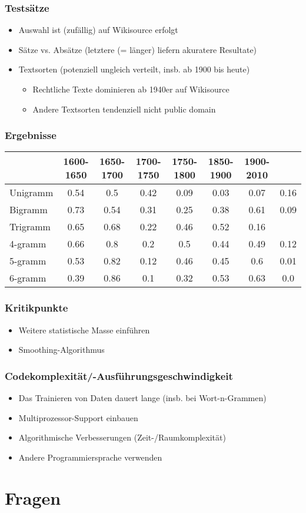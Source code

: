 \documentclass[t]{beamer} %
\begin{document}
\begin{frame}
  \frametitle{Testsätze}
  \begin{itemize}
  \item Auswahl ist (zufällig) auf Wikisource erfolgt\pause
  \vspace*{1ex}
  \item Sätze vs. Absätze (letztere (= länger) liefern akuratere Resultate)\pause
  \item Textsorten (potenziell ungleich verteilt, insb. ab 1900 bis heute)\pause
  \begin{itemize}
   \item Rechtliche Texte dominieren ab 1940er auf Wikisource
   \item Andere Textsorten tendenziell nicht public domain
  \end{itemize}
  \end{itemize}  
\end{frame}

\begin{frame}
  \frametitle{Ergebnisse}
  \begin{tabular}{l|ccccccc}
    & 1600-1650 & 1650-1700 & 1700-1750 & 1750-1800 & 1850-1900 &
    1900-2010 \\
    \hline
    Unigramm & 0.54 & 0.5 & 0.42 & 0.09 & 0.03 & 0.07 & 0.16 \\
    Bigramm & 0.73 & 0.54 & 0.31 & 0.25 & 0.38 & 0.61 & 0.09 \\
    Trigramm & 0.65 & 0.68 & 0.22 & 0.46 & 0.52 & 0.16 \\
    4-gramm & 0.66 & 0.8 & 0.2 & 0.5 & 0.44 & 0.49 & 0.12 \\
    5-gramm & 0.53 & 0.82 & 0.12 & 0.46 & 0.45 & 0.6 & 0.01 \\
    6-gramm & 0.39 & 0.86 & 0.1 & 0.32 & 0.53 & 0.63 & 0.0 \\
  \end{tabular}
\end{frame}

\begin{frame}
  \frametitle{Kritikpunkte}
  \begin{itemize}
  \item Weitere statistische Masse einführen\pause
  \item Smoothing-Algorithmus\pause
  \end{itemize}  
\end{frame}

\begin{frame}
  \frametitle{Codekomplexität/-Ausführungsgeschwindigkeit}
  \begin{itemize}
  \item Das Trainieren von Daten dauert lange (insb. bei Wort-n-Grammen)\pause
  \vspace*{1ex}
  \item Multiprozessor-Support einbauen\pause
  \item Algorithmische Verbesserungen (Zeit-/Raumkomplexität)\pause
  \item Andere Programmiersprache verwenden\pause
  \vspace*{1ex}
  \end{itemize}  
\end{frame}

\section{Fragen}
\end{document}
